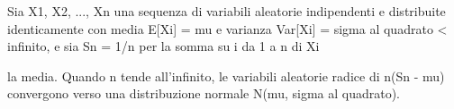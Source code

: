 \documentclass{article}
\begin{document}

Sia X1, X2, ..., Xn una sequenza di variabili aleatorie indipendenti e
distribuite identicamente con media E[Xi] = mu e varianza
Var[Xi] = sigma al quadrato < infinito, e sia
Sn = 1/n per la somma su i da 1 a n di Xi

la media. Quando n tende all’infinito, le variabili aleatorie radice di n(Sn - mu) convergono verso una distribuzione normale N(mu, sigma al quadrato).
\end{document}
